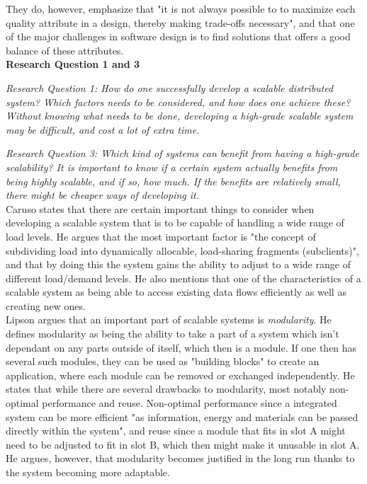 \documentclass{article}
\begin{document}
They do, however, emphasize that "it is not always possible to to maximize
each quality attribute in a design, thereby making trade-offs necessary", and
that one of the major challenges in software design is to find solutions that
offers a good balance of these attributes.
\\

\noindent\textbf{Research Question 1 and 3}

{\scriptsize \emph{Research Question 1: How do one successfully develop a
scalable distributed system? Which factors needs to be considered, and how does
one achieve these? Without knowing what needs to be done, developing a
high-grade scalable system may be difficult, and cost a lot of extra time.}}

{\scriptsize \emph{Research Question 3: Which kind of systems can benefit from
having a high-grade scalability? It is important to know if a certain system
actually benefits from being highly scalable, and if so, how much. If the
benefits are relatively small, there might be cheaper ways of developing it.}}
\\

Caruso \cite{caruso1997toward} states that there are certain important things
to consider when developing a scalable system that is to be capable of handling
a wide range of load levels. He argues that the most important factor is "the
concept of subdividing load into dynamically allocable, load-sharing fragments
(subclients)", and that by doing this the system gains the ability to adjust to
a wide range of different load/demand levels.
He also mentions that one of the characteristics of a scalable system as being
able to access existing data flows efficiently as well as creating new ones.
\\

Lipson \cite{lipson2007principles} argues that an important part of scalable
systems is \emph{modularity}. He defines modularity as being the ability to
take a part of a system which isn't dependant on any parts outside of itself,
which then is a module. If one then has several such modules, they can be used
as "building blocks" to create an application, where each module can be removed
or exchanged independently.  He states that while there are several drawbacks
to modularity, most notably non-optimal performance and reuse.  Non-optimal
performance since a integrated system can be more efficient "as information,
energy and materials can be passed directly within the system", and reuse since
 a module that fits in slot A might need to be adjusted to fit in slot B,
which then might make it unusable in slot A. He argues, however, that
modularity becomes justified in the long run thanks to the system becoming more
adaptable.
\\
\end{document}

